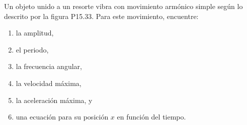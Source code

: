 \item Un objeto unido a un resorte vibra con movimiento armónico simple según lo descrito por la figura P15.33. Para este movimiento, encuentre:
\begin{enumerate}
    \item la amplitud,
    \item el periodo,
    \item la frecuencia angular,
    \item la velocidad máxima,
    \item la aceleración máxima, y
    \item una ecuación para su posición $x$ en función del tiempo.
\end{enumerate}